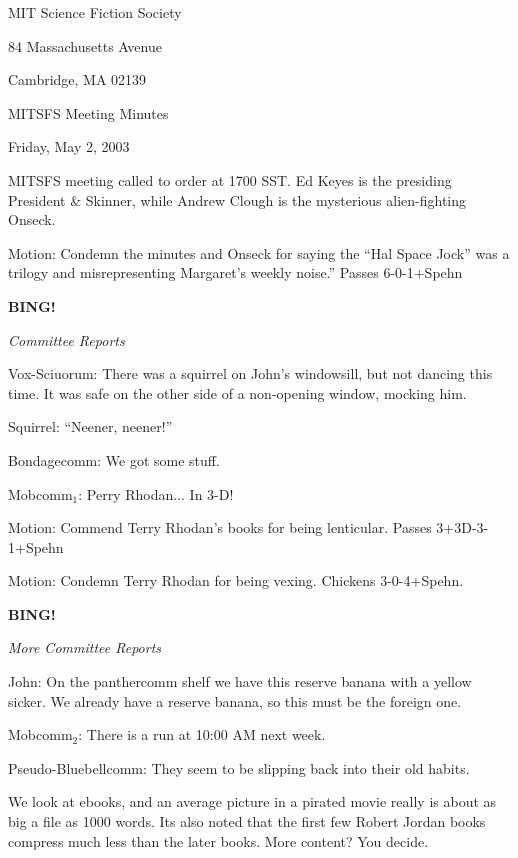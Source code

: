 \documentclass[12pt]{article}
\newcommand{\bing}{{\bf BING!} }
\newcommand{\goto}[1]{\bing \vskip 12pt \centerline{{\em{#1}}}}
\begin{document}
\begin{center}

MIT Science Fiction Society 

84 Massachusetts Avenue

Cambridge, MA 02139

\vspace{12pt}

MITSFS Meeting Minutes 

Friday, May 2, 2003

\end{center}
 
\vspace{18pt}

\setlength{\parskip}{6pt}

\noindent

MITSFS meeting called to order at 1700 SST.  Ed Keyes is the presiding
President \& Skinner, while Andrew Clough is the mysterious
alien-fighting Onseck.

Motion: Condemn the minutes and Onseck for saying the ``Hal Space
Jock'' was a trilogy and misrepresenting Margaret's weekly noise.''
Passes 6-0-1+Spehn

\goto{Committee Reports}

Vox-Sciuorum: There was a squirrel on John's windowsill, but not
dancing this time.  It was safe on the other side of a non-opening
window, mocking him.

Squirrel: ``Neener, neener!''

Bondagecomm:  We got some stuff.

Mobcomm$_1$:  Perry Rhodan... In 3-D!

Motion: Commend Terry Rhodan's books for being lenticular.  Passes
3+3D-3-1+Spehn

Motion:  Condemn Terry Rhodan for being vexing.  Chickens 3-0-4+Spehn.

\goto{More Committee Reports}

John: On the panthercomm shelf we have this reserve banana with a
yellow sicker.  We already have a reserve banana, so this must be the
foreign one.

Mobcomm$_2$:  There is a run at 10:00 AM next week.

Pseudo-Bluebellcomm:   They seem to be slipping back into their old habits.

We look at ebooks, and an average picture in a pirated movie really is
about as big a file as 1000 words.  Its also noted that the first few
Robert Jordan books compress much less than the later books.  More
content?  You decide.
\end{document}
